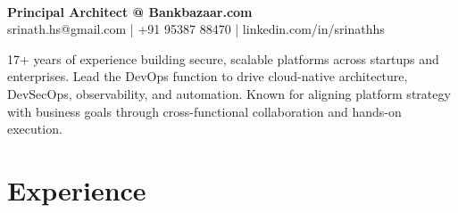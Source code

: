 \documentclass[11pt]{article}
\newcommand{\name}[1]{\noindent{\LARGE\sffamily\textbf{#1}}}
\begin{document}
\pagestyle{empty}
\color{bodytext}

\name{Srinath H S}\\[0.5em]
\textbf{Principal Architect @ Bankbazaar.com}\\[0.3em]
srinath.hs@gmail.com \quad | \quad +91 95387 88470 \quad | \quad linkedin.com/in/srinathhs

17+ years of experience building secure, scalable platforms across startups and enterprises.
Lead the DevOps function to drive cloud-native architecture, DevSecOps, observability, and automation.
Known for aligning platform strategy with business goals through cross-functional collaboration and hands-on execution.


\section*{Experience}
\end{document}
